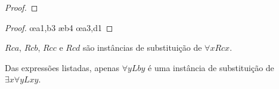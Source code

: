 \begin{earg}
\begin{solutioninlist}
\begin{proof}
		 
		 
		 
	\close
	 
	 
\end{proof}
\end{solutioninlist}
\item%
\begin{solutioninlist}
\begin{proof}
	 
	\open
		 
		 
		 
		 \oe{a1,b3}
		 \ae{b4}
		 
	\close
	 
	\open
		 
		 \oe{a3,d1}
		 
		 
	\close
	 
\end{proof}
\end{solutioninlist}
\end{earg}


\begin{earg}
\item $Rca$, $Rcb$, $Rcc$ e $Rcd$ são instâncias de substituição de $\forall x Rcx$.
\item Das expressões listadas, apenas $\forall y Lby$ é uma instância de substituição de $\exists x\forall y Lxy$.
\end{earg}




